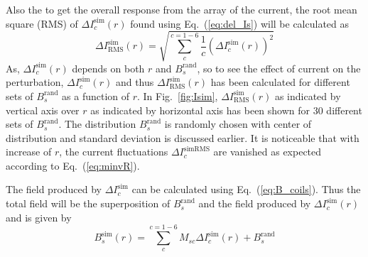 Also the to get the overall response from the array of the current, the root mean square (RMS) of $\Delta I_c^{\text{sim}}(r)$ found using Eq.~(\ref{eq:del_Is}) will be calculated as
\begin{equation}
     \Delta I_{\text{RMS}}^{\text{sim}}(r)= \sqrt{\sum_c^{c=1-6} \frac{1}{c}(\Delta I_c^{\text{sim}}(r))^2}
\end{equation}
As, $\Delta I_c^{\text{sim}}(r)$ depends on both $r$ and $B_s^{\text{rand}}$, so to see the effect of current on the perturbation, $\Delta I_c^{\text{sim}}(r)$ and thus $ \Delta I_{\text{RMS}}^{\text{sim}}(r)$  has been calculated for different sets of $B_s^{\text{rand}}$ as a function of $r$. In Fig.~\ref{fig:Isim}, $ \Delta I_{\text{RMS}}^{\text{sim}}(r)$ as indicated by vertical axis over $r$ as indicated by horizontal axis has been shown for 30 different sets of $B_s^{\text{rand}}$. The distribution $B_s^{\text{rand}}$ is randomly chosen with center of distribution and standard deviation is discussed earlier. It is noticeable that with increase of $r$, the current fluctuations $\Delta I_c^{\text{simRMS}}$ are vanished as expected according to Eq.~(\ref{eq:minvR}).


\FloatBarrier
The field produced by $ \Delta I_c^{\text{sim}}$ can be calculated using Eq.~(\ref{eq:B_coils}). Thus the total field will be the superposition of $B_s^{\text{rand}}$ and the field produced by $ \Delta I_c^{\text{sim}}(r)$ and is given by
\begin{equation}\label{eq:B_coils-sim}
    B_s^{\text{sim}}(r) =\sum_c^{c=1-6} M_{sc} \Delta I_c^{\text{sim}}(r) + B_s^{\text{rand}}
\end{equation}

